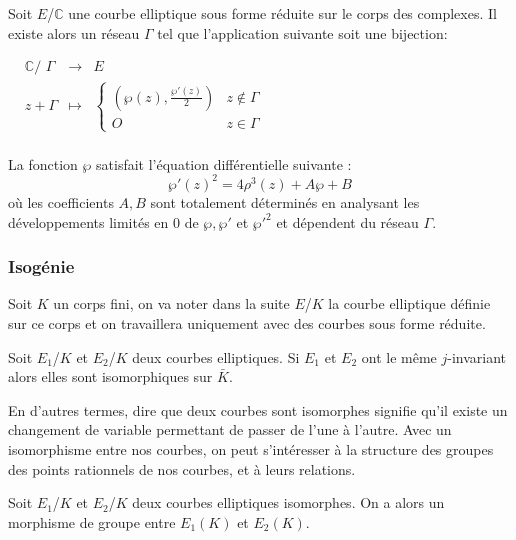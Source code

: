 \documentclass[12pt]{article}
\begin{document}
\begin{thm}
Soit $E$/$\mathbb{C}$ une courbe elliptique sous forme réduite sur le corps des complexes. Il existe alors un réseau $\Gamma$ tel que l'application suivante soit une bijection:
\newline
\medskip


$\begin{array}{cccc}
& \mathbb{C}\text{/ }\Gamma & \to & E \\
& z + \Gamma & \mapsto & \left\lbrace
\begin{array}{cc}
 (\wp(z), \frac{{\wp'}(z)}{2})  & z \notin \Gamma \\
 O & z \in \Gamma
\end{array}\right.\\
\end{array}$
\end{thm}

\begin{thm}
La fonction $\wp$ satisfait l'équation différentielle suivante : 
\begin{equation*}
{\wp'}(z)^2 = 4\rho^3(z) + A \wp + B
\end{equation*}
où les coefficients $A,B$ sont totalement déterminés en analysant les développements limités en $0$ de $\wp, {\wp'}$ et ${\wp'}^2$ et dépendent du réseau $\Gamma$.
\end{thm}

\subsubsection{Isogénie}
Soit $K$ un corps fini, on va noter dans la suite $E$/$K$ la courbe elliptique définie sur ce corps et on travaillera uniquement avec des courbes sous forme réduite.

\begin{defi}
Soit $E_1$/$K$ et $E_2$/$K$ deux courbes elliptiques. Si $E_1$ et $E_2$ ont le même $j$-invariant alors elles sont isomorphiques sur $\bar{K}$. 
\end{defi}
En d'autres termes, dire que deux courbes sont isomorphes signifie qu'il existe un changement de variable permettant de passer de l'une à l'autre. Avec un isomorphisme entre nos courbes, on peut s'intéresser à la structure des groupes des points rationnels de nos courbes, et à leurs relations.

\begin{prop}
Soit $E_1$/$K$ et $E_2$/$K$ deux courbes elliptiques isomorphes. On a alors un morphisme de groupe entre $E_1(K)$ et $E_2(K)$.
\end{prop}
\end{document}
